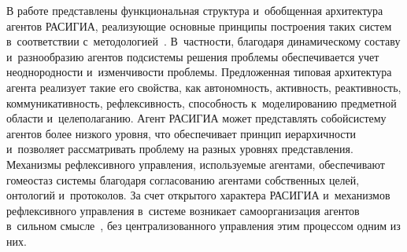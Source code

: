 \begin{multicols}{2}
  В работе представлены функциональная структура и~обобщенная 
архитектура агентов \mbox{РАСИГИА}, ре\-а\-ли\-зу\-ющие основные принципы по\-стро\-ения 
таких сис\-тем в~соответствии с~методологией~\cite{12-lis}. В~част\-ности, 
благодаря динамическому со\-ста\-ву и~разнообразию агентов под\-сис\-те\-мы 
решения проб\-ле\-мы обеспечивается учет не\-од\-но\-род\-ности и~из\-мен\-чи\-вости 
проблемы. Предложенная типовая архитектура агента реализует такие его 
свойства, как ав\-то\-ном\-ность, ак\-тив\-ность, ре\-ак\-тив\-ность, ком\-му\-ни\-ка\-тив\-ность, 
реф\-лек\-сив\-ность, спо\-соб\-ность к~моделированию предметной об\-ласти 
и~целеполаганию. Агент \mbox{РАСИГИА} может пред\-став\-лять собой\linebreak сис\-те\-му 
агентов более низ\-ко\-го уровня, что обеспечивает принцип ие\-рар\-хич\-ности 
и~поз\-во\-ля\-ет рас\-смат\-ри\-вать проб\-ле\-му на разных уровнях пред\-став\-ле\-ния. 
Механизмы рефлексивного управ\-ле\-ния, \mbox{ис\-поль\-зу\-емые} агентами, обеспечивают 
гомеостаз сис\-те\-мы благодаря согласованию агентами собственных целей, 
онтологий и~протоколов. За счет открытого характера \mbox{РАСИГИА} 
и~механизмов рефлексивного управ\-ле\-ния в~сис\-те\-ме возникает 
самоорганизация агентов в~сильном смыс\-ле~\cite{11-lis}, без 
централизованного управ\-ле\-ния этим процессом одним из них. 

\vspace*{-3pt}
  
{\small\frenchspacing
 {\baselineskip=11.5pt
 \begin{thebibliography}{99}
 
 \vspace*{-3pt}
 

\end{thebibliography}}}
\end{multicols}
